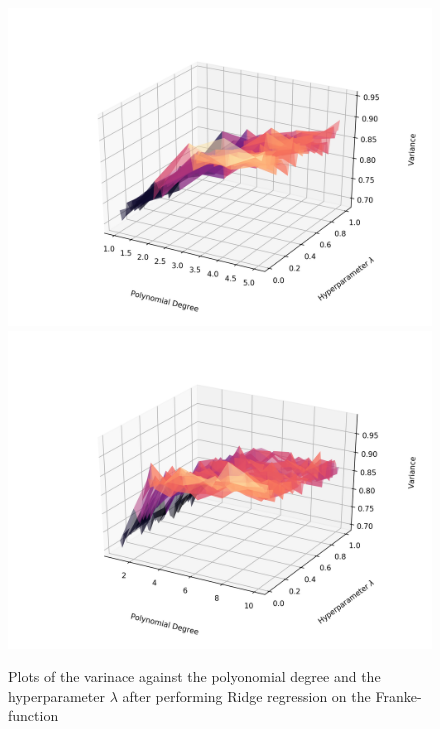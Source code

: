\documentclass[a4paper,10pt,english]{article}
\begin{document}
\begin{figure}[H]
	\centering 
	\includegraphics[scale=0.47]{../franke_output/part_D_1.png}
	\includegraphics[scale=0.47]{../franke_output/part_D_1_highdeg.png}
	\caption{
		Plots of the varinace against the polyonomial degree and the hyperparameter $\lambda$ after performing Ridge regression on the Franke-function
	}
	\label{part_d1}
\end{figure}
\end{document}
